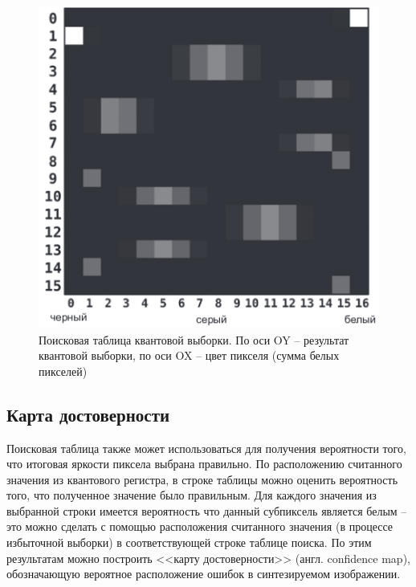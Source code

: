 \begin{figure}[H]
	\begin{center}
		\includegraphics[scale=0.55]{img/qss_table.png}
	\end{center}
	\captionsetup{justification=centering}
	\caption{Поисковая таблица квантовой выборки. По оси OY -- результат квантовой выборки, по оси OX -- цвет пикселя (сумма белых пикселей)}
	\label{img:qss_table}
\end{figure}

\subsection{Карта достоверности}\label{map}

Поисковая таблица также может использоваться для получения вероятности того, что итоговая яркости пиксела выбрана правильно. По расположению считанного значения из квантового регистра, в строке таблицы можно оценить вероятность того, что полученное значение было правильным. Для каждого значения из выбранной строки имеется вероятность что данный субпиксель является белым -- это можно сделать с помощью расположения считанного значения (в процессе избыточной выборки) в соответствующей строке таблице поиска. По этим результатам можно построить <<карту достоверности>> (англ. confidence map), обозначающую вероятное расположение ошибок в синтезируемом изображении.

